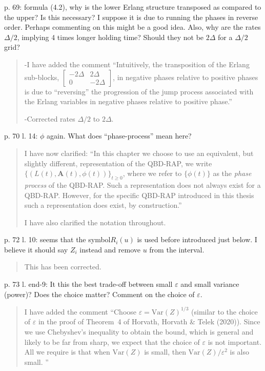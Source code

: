 \documentclass[a4paper]{article}
\begin{document}
p. 69: formula (4.2), why is the lower Erlang structure transposed as compared to the upper? Is this necessary? I suppose it is due to running the phases in reverse order. Perhaps commenting on this might be a good idea. Also, why are the rates \(\Delta/2\), implying 4 times longer holding time? Should they not be \(2\Delta\) for a \(\Delta/2\) grid?
\begin{quote}
    -I have added the comment ``Intuitively, the transposition of the Erlang sub-blocks, \(\left[\begin{array}{cc} -2\Delta & 2\Delta \\ 0 & -2\Delta \end{array}\right]\), in negative phases relative to positive phases is due to ``reversing'' the progression of the jump process associated with the Erlang variables in negative phases relative to positive phase.''
    
    -Corrected rates \(\Delta/2\) to \(2\Delta\).  
\end{quote}

p. 70 l. 14: \(\phi\) again. What does “phase-process” mean here? 
\begin{quote}
    I have now clarified: ``In this chapter we choose to use an equivalent, but slightly different, representation of the QBD-RAP, we write \(\{(L(t),\boldsymbol A(t),\phi(t))\}_{t\geq 0}\), where we refer to \(\{\phi(t)\}\) as the \emph{phase process} of the QBD-RAP. Such a representation does not always exist for a QBD-RAP. However, for the specific QBD-RAP introduced in this thesis such a representation does exist, by construction.''

    I have also clarified the notation throughout. 
\end{quote}

p. 72 l. 10: seems that the symbol\(R_i(u)\) is used before introduced just below. I believe
it should say \(Z_i\) instead and remove \(u\) from the interval.
\begin{quote}
    This has been corrected. 
\end{quote}

p. 73 l. end-9: It this the best trade-off between small \(\varepsilon\) and small variance (power)? Does
the choice matter? Comment on the choice of \(\varepsilon\).
\begin{quote}
    I have added the comment ``Choose \(\varepsilon = \mbox{Var}(Z)^{1/3}\) (similar to the choice of \(\varepsilon\) in the proof of Theorem~4 of Horvath, Horvath \& Telek (2020)). Since we use Chebyshev's inequality to obtain the bound, which is general and likely to be far from sharp, we expect that the choice of \(\varepsilon\) is not important. All we require is that when \(\mbox{Var}(Z)\) is small, then \(\mbox{Var}(Z)/\varepsilon^2\) is also small. ''
\end{quote}
\end{document}
